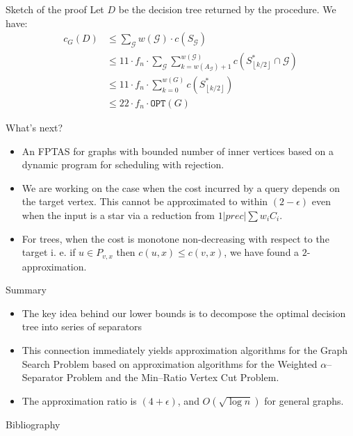 \documentclass{beamer}
\newcommand{\br}[1]{\mathopen{}\left( #1 \right)}
\newcommand{\fl}[1]{\mathopen{}\left\lfloor #1 \right\rfloor}
\newcommand{\OPT}{\texttt{OPT}}
\begin{document}
\begin{frame}{Sketch of the proof}
    Let $D$ be the decision tree returned by the procedure. We have:
        \begin{align*}
            c_G\br{D}&\leq \sum_{\mathcal{G}}w\br{\mathcal{G}}\cdot c\br{S_{\mathcal{G}}}\\
            &\leq 11 \cdot f_n\cdot \sum_{\mathcal{G}}\sum_{k=w\br{A_{\mathcal{G}}}+1}^{w\br{\mathcal{G}}}c\br{S_{\fl{k/2}}^*\cap \mathcal{G}}
            \\&\leq 
            11 \cdot f_n\cdot\sum_{k=0}^{w\br{G}}c\br{S_{\fl{k/2}}^*} \\
            &\leq 22 \cdot f_n\cdot \OPT\br{G}
        \end{align*}
\end{frame}
\begin{frame}{
    What's next?}
\begin{itemize}
    \item An FPTAS for graphs with bounded number of inner vertices based on a dynamic program for scheduling with rejection.
    \pause
    \item We are working on the case when the cost incurred by a query depends on the target vertex. This cannot be approximated to within $\br{2-\epsilon}$ even when the input is a star via a reduction from $1|prec| \sum w_iC_i$.
    \pause
    \item For trees, when the cost is monotone non-decreasing with respect to the target i. e. if $u \in P_{v,x}$ then $c\br{u,x} \leq c\br{v,x}$, we have found a $2$-approximation.
    \pause
    \end{itemize}
\end{frame}
\begin{frame}{Summary}
\begin{itemize}
    \item The key idea behind our lower bounds is to decompose the optimal decision tree into series of separators
    \item This connection immediately yields approximation algorithms for the Graph Search Problem based on approximation algorithms for the Weighted $\alpha$–Separator Problem and the Min–Ratio Vertex Cut Problem.
    \item The approximation ratio is $\br{4+\epsilon}$, and $O\br{\sqrt{\log n}}$ for general graphs.
\end{itemize}
\end{frame}

\begin{frame}[allowframebreaks]{Bibliography}
\printbibliography
\end{frame}
\end{document}

